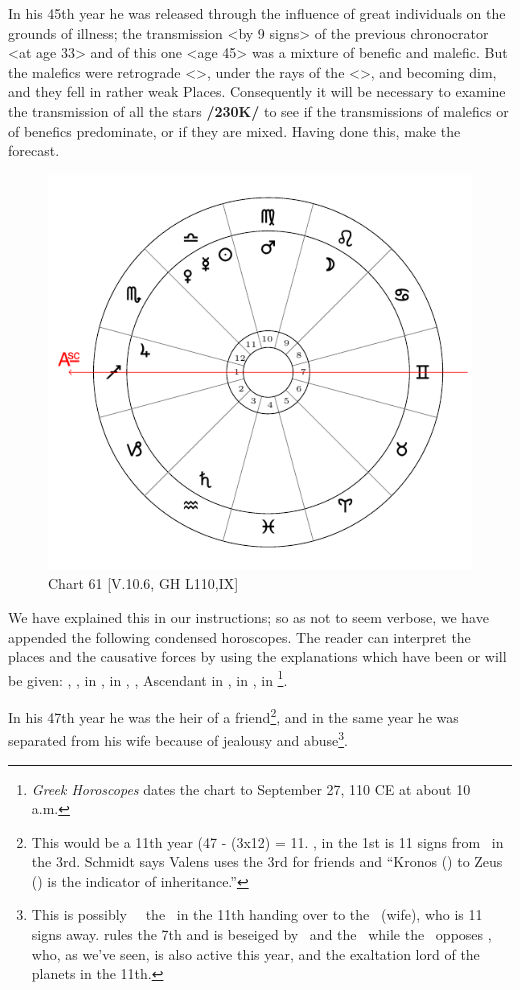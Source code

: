 In his 45th year he was released through the influence of great individuals on the grounds of illness; the transmission <by 9 signs> of the previous chronocrator <at age 33> and of this one <age 45> was a mixture of benefic and malefic. But the malefics were retrograde <\Saturn>, under the rays of the \Sun\xspace <\Mars>, and becoming dim, and they fell in rather weak Places.
Consequently it will be necessary to examine the transmission of all the stars \textbf{/230K/} to see if the transmissions of malefics or of benefics predominate, or if they are mixed. Having done this, make the forecast. 

\newpage
\begin{figure}
\centering
\includegraphics[width=.68\textwidth]{charts/5_10_06}
\caption{Chart 61 [V.10.6, GH L110,IX]}
\label{fig:chart61}
\end{figure}

\noindent We have explained this in our instructions; so as not to seem verbose, we have appended the following condensed horoscopes. The reader can interpret the places and the causative forces by using the explanations which have been or will be given: \Sun, \Mercury, \Venus \xspace in \Libra, \Saturn\xspace in \Aquarius, \Jupiter, Ascendant in \Sagittarius, \Mars\xspace in \Virgo, \Moon in \Leo\footnote{\textit{Greek Horoscopes} dates the chart to September 27, 110 CE at about 10 a.m.}. 

In his 47th year he was the heir of a friend\footnote{This would be a 11th year (47 - (3x12) = 11. \Jupiter, in the 1st is 11 signs from \Saturn\, in the 3rd. Schmidt says Valens uses the 3rd for friends and ``Kronos (\Saturn) to Zeus (\Jupiter) is the indicator of inheritance.''}, and in the same year he was separated from his wife because of jealousy and abuse\footnote{This is possibly \Venus\, \Mercury\, the \Sun\, in the 11th handing over to the \Moon\, (wife), who is 11 signs away. \Mercury rules the 7th and is beseiged by \Venus\, and the \Sun\, while the \Moon\, opposes \Saturn, who, as we've seen, is also active this year, and the exaltation lord of the planets in the 11th.}.

